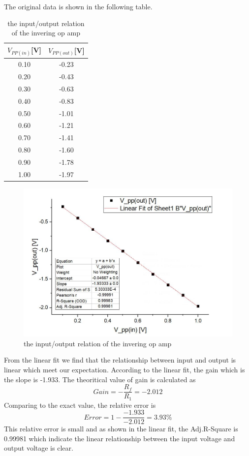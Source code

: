 \documentclass[12pt,a4paper]{article}
\begin{document}
The original data is shown in the following table.
\begin{table}[htp]
\centering
\begin{tabular}{|c|c|}
\hline
$V_{PP(in)}${[}V{]} & $V_{PP(out)}${[}V{]} \\ \hline
0.10                & -0.23                \\ \hline
0.20                & -0.43                \\ \hline
0.30                & -0.63                \\ \hline
0.40                & -0.83                \\ \hline
0.50                & -1.01                \\ \hline
0.60                & -1.21                \\ \hline
0.70                & -1.41                \\ \hline
0.80                & -1.60                \\ \hline
0.90                & -1.78                \\ \hline
1.00                & -1.97                \\ \hline
\end{tabular}
\caption{the input/output relation of the invering op amp}
\end{table} 

  \begin{figure}[H]
  \centering
  \includegraphics[width=.8\textwidth]{Figure9.jpg}
  \caption{the input/output relation of the invering op amp}
  \label{img} 
\end{figure}

From the linear fit we find that the relationship between input and output is linear which meet our expectation. According to the linear fit, the gain which is the slope is -1.933. The theoritical value of gain is calculated as
$$Gain = -\frac{R_f}{R_1}= -2.012$$
Comparing to the exact value, the relative error is 
$$Error = 1- \frac{-1.933}{-2.012} = 3.93\%$$
This relative error is small and as shown in the linear fit, the Adj.R-Square is 0.99981 which indicate the linear relationship between the input voltage and output voltage is clear.
\end{document}
